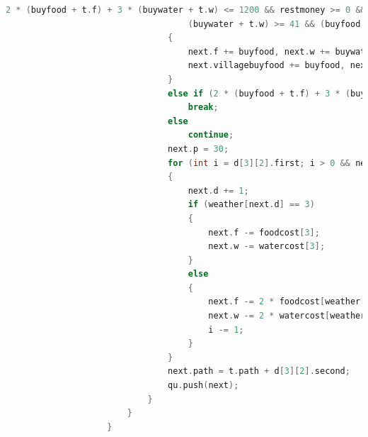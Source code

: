 \documentclass[withoutpreface,bwprint]{cumcmthesis} %
\begin{document}
\begin{appendices}
\begin{lstlisting}[language=c++]
                                    2 * (buyfood + t.f) + 3 * (buywater + t.w) <= 1200 && restmoney >= 0 && 
                                    (buywater + t.w) >= 41 && (buyfood + t.f) >= 42)
                                {
                                    next.f += buyfood, next.w += buywater, next.money = restmoney;
                                    next.villagebuyfood += buyfood, next.villagebuywater += buywater;
                                }
                                else if (2 * (buyfood + t.f) + 3 * (buywater + t.w) > 1200)
                                    break;
                                else
                                    continue;
                                next.p = 30;
                                for (int i = d[3][2].first; i > 0 && next.d <= 30;)
                                {
                                    next.d += 1;
                                    if (weather[next.d] == 3)
                                    {
                                        next.f -= foodcost[3];
                                        next.w -= watercost[3];
                                    }
                                    else
                                    {
                                        next.f -= 2 * foodcost[weather[next.d]];
                                        next.w -= 2 * watercost[weather[next.d]];
                                        i -= 1;
                                    }
                                }
                                next.path = t.path + d[3][2].second;
                                qu.push(next);
                            }
                        }
                    }
    

\end{lstlisting}
\end{appendices}
\end{document}
